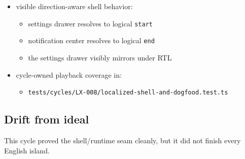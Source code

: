 \begin{itemize}
  \begin{itemize}
  \tightlist
  \item
    landing prompt and footer
  \item
    onboarding / empty-state copy
  \item
    localized search/settings surfaces
  \item
    settings-row labels, descriptions, value labels, and feedback toasts
  \end{itemize}
\item
  visible direction-aware shell behavior:

  \begin{itemize}
  \tightlist
  \item
    settings drawer resolves to logical \texttt{s\allowbreak{}t\allowbreak{}a\allowbreak{}r\allowbreak{}t}
  \item
    notification center resolves to logical \texttt{e\allowbreak{}n\allowbreak{}d}
  \item
    the settings drawer visibly mirrors under RTL
  \end{itemize}
\item
  cycle-owned playback coverage in:

  \begin{itemize}
  \tightlist
  \item
    \texttt{t\allowbreak{}e\allowbreak{}s\allowbreak{}t\allowbreak{}s\allowbreak{}/\allowbreak{}c\allowbreak{}y\allowbreak{}c\allowbreak{}l\allowbreak{}e\allowbreak{}s\allowbreak{}/\allowbreak{}L\allowbreak{}X\allowbreak{}-\allowbreak{}0\allowbreak{}0\allowbreak{}8\allowbreak{}/\allowbreak{}l\allowbreak{}o\allowbreak{}c\allowbreak{}a\allowbreak{}l\allowbreak{}i\allowbreak{}z\allowbreak{}e\allowbreak{}d\allowbreak{}-\allowbreak{}s\allowbreak{}h\allowbreak{}e\allowbreak{}l\allowbreak{}l\allowbreak{}-\allowbreak{}a\allowbreak{}n\allowbreak{}d\allowbreak{}-\allowbreak{}d\allowbreak{}o\allowbreak{}g\allowbreak{}f\allowbreak{}o\allowbreak{}o\allowbreak{}d\allowbreak{}.\allowbreak{}t\allowbreak{}e\allowbreak{}s\allowbreak{}t\allowbreak{}.\allowbreak{}t\allowbreak{}s}
  \end{itemize}
\end{itemize}

\subsection{Drift from ideal}\label{record-194-drift-from-ideal}

This cycle proved the shell/runtime seam cleanly, but it did not finish every English island.

